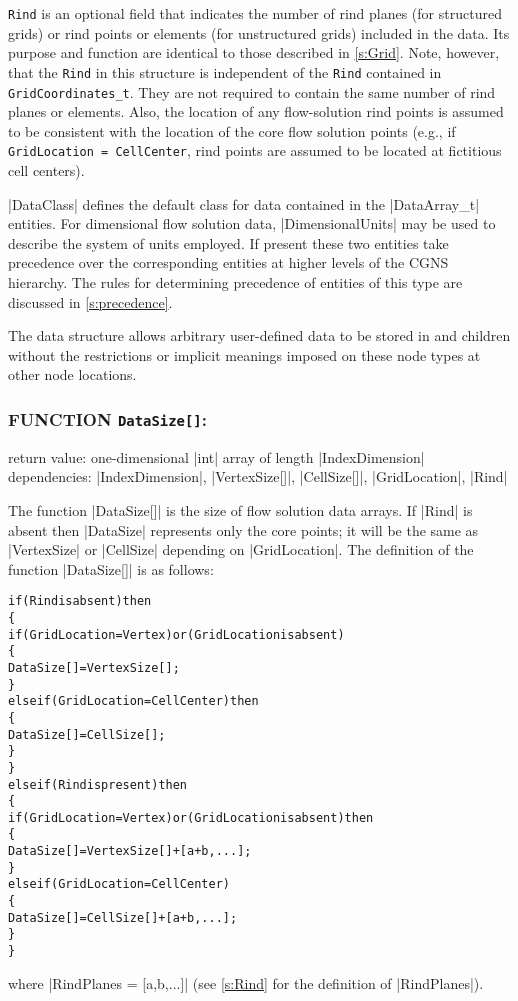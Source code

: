 \texttt{Rind} is an optional field that indicates
the number of rind planes (for structured grids) or rind points or
elements (for unstructured grids) included in the data.
Its purpose and function are identical to those described in
\autoref{s:Grid}.
Note, however, that the \texttt{Rind} in this structure is independent
of the \texttt{Rind} contained in \texttt{GridCoordinates\_t}.
They are not required to contain the same number of rind planes or
elements.
Also, the location of any flow-solution rind points is assumed to be
consistent with the location of the core flow solution points (e.g.,
if \texttt{GridLocation = CellCenter}, rind points are assumed to be
located at fictitious cell centers).

|DataClass| defines the default class for data contained in the
|DataArray_t| entities.  For dimensional flow solution data,
|DimensionalUnits| may be used to describe the system of units employed.
If present these two entities take precedence over the corresponding entities
at higher levels of the CGNS hierarchy.  The rules for determining precedence
of entities of this type are discussed in \autoref{s:precedence}.

The  data structure allows arbitrary
user-defined data to be stored in  and
 children without the restrictions or implicit
meanings imposed on these node types at other node locations.

\subsubsection*{FUNCTION \texttt{DataSize[]}:}

\noindent return value: one-dimensional |int| array of length
                        |IndexDimension| \\
\noindent dependencies: |IndexDimension|, |VertexSize[]|, |CellSize[]|,
                        |GridLocation|, |Rind|

The function |DataSize[]| is the size of flow solution data arrays.
If |Rind| is absent then |DataSize| represents only the core points;
it will be the same as |VertexSize| or |CellSize| depending on
|GridLocation|.
The definition of the function |DataSize[]| is as follows:

\begin{alltt}
  if (Rind is absent) then
    \{
    if (GridLocation = Vertex) or (GridLocation is absent)
      \{
      DataSize[] = VertexSize[] ;
      \}
    else if (GridLocation = CellCenter) then
      \{
      DataSize[] = CellSize[] ;
      \}
    \}
  else if (Rind is present) then
    \{
    if (GridLocation = Vertex) or (GridLocation is absent) then
      \{
      DataSize[] = VertexSize[] + [a + b,...] ;
      \}
    else if (GridLocation = CellCenter)
      \{
      DataSize[] = CellSize[] + [a + b,...] ;
      \}
    \}
\end{alltt}
where |RindPlanes = [a,b,...]| (see \autoref{s:Rind} 
for the definition of |RindPlanes|). 

